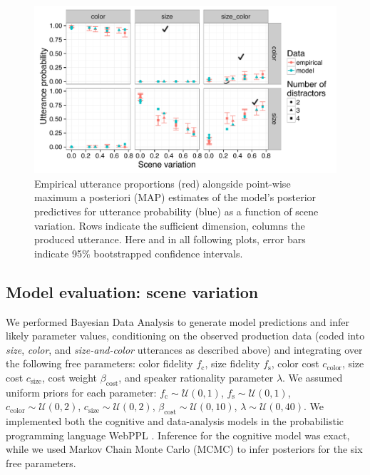 \documentclass[11pt]{article}
\begin{document}
\begin{figure}
\centering
\includegraphics[width=\textwidth]{../../../models/1a_bda_basic/results_bda/graphs/scenevariation-fixed-reducedconditions-unlogged}
\caption{Empirical utterance proportions  (red)  alongside point-wise maximum a posteriori (MAP) estimates of the model's posterior predictives for utterance probability (blue) as a function of scene variation. Rows indicate the sufficient dimension, columns the produced utterance. Here and in all following plots, error bars indicate 95\% bootstrapped confidence intervals.}
\label{fig:exp1results}
\end{figure}


\subsection{Model evaluation: scene variation}
\label{sec:modifiermodeleval}


We performed Bayesian Data Analysis to generate model predictions and infer likely parameter values, conditioning on the observed production data (coded into \emph{size}, \emph{color}, and \emph{size-and-color} utterances as described above) and integrating over the following free parameters: color fidelity $f_{\textrm{c}}$, size fidelity $f_{\textrm{s}}$, color cost $c_{\textrm{color}}$, size cost $c_{\textrm{size}}$, cost weight $\beta_{\textrm{cost}}$, and speaker rationality parameter $\lambda$. We assumed uniform priors for each parameter: $f_{\textrm{c}} \sim \mathcal{U}(0,1)$, $f_{\textrm{s}} \sim \mathcal{U}(0,1)$, $c_{\textrm{color}} \sim \mathcal{U}(0,2)$, $c_{\textrm{size}} \sim \mathcal{U}(0,2)$, $\beta_{\textrm{cost}} \sim \mathcal{U}(0,10)$, $\lambda  \sim \mathcal{U}(0,40)$.
We implemented both the cognitive and data-analysis models in the probabilistic programming language WebPPL \cite{GoodmanStuhlmuller14_DIPPL}.
Inference for the cognitive model was exact, while we used Markov Chain Monte Carlo (MCMC) to infer posteriors for the six free parameters.
\end{document}
